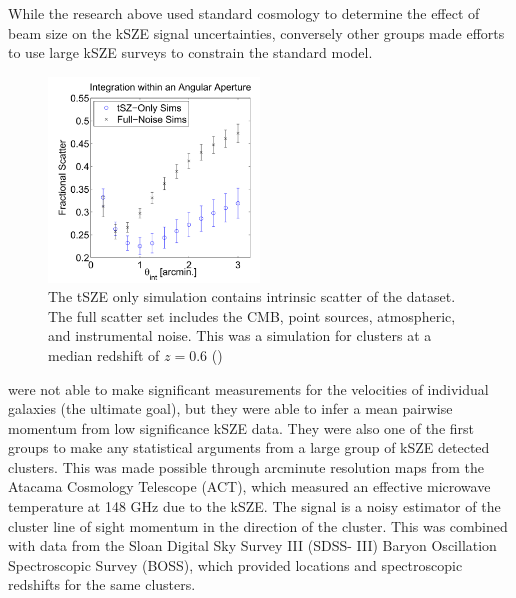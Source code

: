 \documentclass[manuscript]{aastex}
\begin{document}
While the research above used standard cosmology to determine the effect of beam size on the kSZE signal uncertainties, conversely other groups made efforts to use large kSZE surveys to constrain the standard model.
\begin{figure}
\vspace{-0.8cm}
  \begin{center}
    \includegraphics[width=0.5\textwidth]{saliwanchick1.png}
   \end{center}
\caption[MCMC Cluster Simulation Showing Scatter Versus Integration Angle -(\cite{Saliwanchik2015})]{The tSZE only simulation contains intrinsic scatter of the dataset. The full scatter set includes the CMB, point sources, atmospheric, and instrumental noise. This was a simulation for clusters at a median redshift of $z = 0.6$ (\cite{Saliwanchik2015})}
\label{fig:sali1}
\end{figure}
\cite{Hand2012} were not able to make significant measurements for the velocities of individual galaxies (the ultimate goal), but they were able to infer a mean pairwise momentum from low significance kSZE data. They were also one of the first groups to make any statistical arguments from a large group of kSZE detected clusters. This was made possible through arcminute resolution maps from the Atacama Cosmology Telescope (ACT), which measured an effective microwave temperature at 148 GHz due to the kSZE. The signal is a noisy estimator of the cluster line of sight momentum in the direction of the cluster. This was combined with data from the Sloan Digital Sky Survey III (SDSS- III) Baryon Oscillation Spectroscopic Survey (BOSS), which provided locations and spectroscopic redshifts for the same clusters. 
\end{document}
